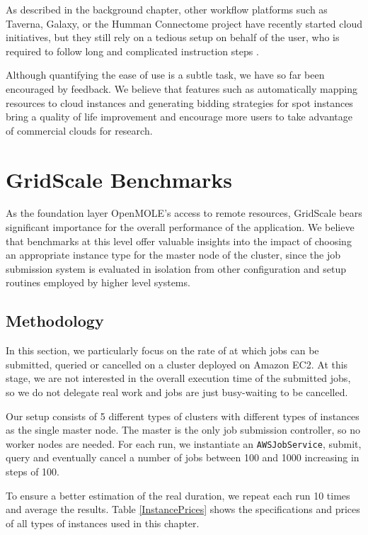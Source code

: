As described in the background chapter, other workflow platforms such as Taverna, Galaxy, or the Humman Connectome project have recently started cloud initiatives, but they still rely on a tedious setup on behalf of the user, who is required to follow long and complicated instruction steps \cite{TavernaAWS, GalaxyAWS, Connectome}. 

Although quantifying the ease of use is a subtle task, we have so far been encouraged by feedback. We believe that features such as automatically mapping resources to cloud instances and generating bidding strategies for spot instances bring a quality of life improvement and encourage more users to take advantage of commercial clouds for research.

\section{GridScale Benchmarks}

As the foundation layer OpenMOLE's access to remote resources, GridScale bears significant importance for the overall performance of the application. We believe that benchmarks at this level offer valuable insights into the impact of choosing an appropriate instance type for the master node of the cluster, since the job submission system is evaluated in isolation from other configuration and setup routines employed by higher level systems.

\subsection{Methodology}

In this section, we particularly focus on the rate of at which jobs can be submitted, queried or cancelled on a cluster deployed on Amazon EC2. At this stage, we are not interested in the overall execution time of the submitted jobs, so we do not delegate real work and jobs are just busy-waiting to be cancelled.

Our setup consists of 5 different types of clusters with different types of instances as the single master node. The master is the only job submission controller, so no worker nodes are needed. For each run, we instantiate an \verb|AWSJobService|, submit, query and eventually cancel a number of jobs between 100 and 1000 increasing in steps of 100. 

To ensure a better estimation of the real duration, we repeat each run 10 times and average the results. Table \ref{InstancePrices} shows the specifications and prices of all types of instances used in this chapter.

